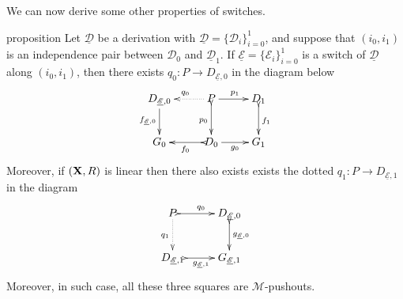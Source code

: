\documentclass[a4paper,UKenglish,cleveref,pdftex, thm-restate,numberwithinsect]{lipics}
\def\R{\mathsf{R}}
\def\D{\textbf {\textup{D}}}
\def\X{\textbf {\textup{X}}}
\newcommand{\dder}[1]{\mathscr{#1}}
\newcommand{\der}[1]{\underline{\dder{#1}}}
\begin{document}
We can now derive some other properties  of switches.
\begin{theoremEnd}[category=sec3]{proposition}\label{lem:cose} Let $\der{D}$ be a derivation with $\der{D}=\{\dder{D}_i\}_{i=0}^1$,  and suppose that $(i_0, i_1)$ is an independence pair between $\dder{D}_0$  and $\der{D}_1$. 	If $\der{E}=\{\dder{E}_i\}_{i=0}^1$ is a switch of $\der{D}$ along $(i_0, i_1)$, then there exists $q_0\colon P\to D_{\der{E},0}$ in the diagram below
	\[\xymatrix{D_{\der{E},0} \ar[d]_{f_{\der{E},0}}&P \ar@{.>}[l]_{q_0} \ar[r]^{p_1} \ar@{>->}[d]_{p_0}& D_1 \ar@{>->}[d]^{f_1}\\ G_{0}&D_0 \ar@{>->}[l]^{f_0}\ar[r]_{g_0}& G_1}\]
	Moreover, if $(\X, \R)$ is linear then there also exists  exists the dotted $q_1\colon P\to D_{\der{E},1}$ in the diagram
	\[\xymatrix{P  \ar@{>->}[r]^{q_0} \ar@{.>}[d]_{q_1}& D_{\der{E},0} \ar@{>->}[d]^{g_{\der{E},0}}\\D_{\der{E},1} \ar@{>->}[r]_{g_{\der{E},1}}  &G_{\der{E},1}}\]
	Moreover, in such case, all these three squares are $\mathcal{M}$-pushouts. 
\end{theoremEnd}
\end{document}
